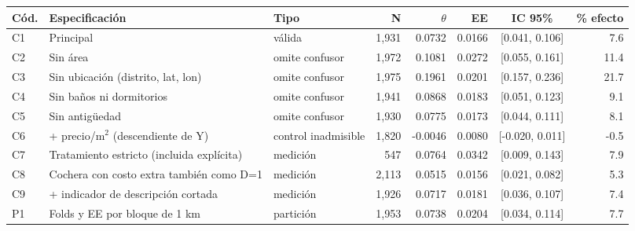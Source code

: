 \begin{tabular}{llp{3cm}rrrcr}
\toprule
Cód. & Especificación & Tipo & N & $\theta$ & EE & IC 95\% & \% efecto \\
\midrule
C1 & Principal & válida & 1,931 & 0.0732 & 0.0166 & [0.041, 0.106] & 7.6 \\
C2 & Sin área & omite confusor & 1,972 & 0.1081 & 0.0272 & [0.055, 0.161] & 11.4 \\
C3 & Sin ubicación (distrito, lat, lon) & omite confusor & 1,975 & 0.1961 & 0.0201 & [0.157, 0.236] & 21.7 \\
C4 & Sin baños ni dormitorios & omite confusor & 1,941 & 0.0868 & 0.0183 & [0.051, 0.123] & 9.1 \\
C5 & Sin antigüedad & omite confusor & 1,930 & 0.0775 & 0.0173 & [0.044, 0.111] & 8.1 \\
C6 & + precio/m$^2$ (descendiente de Y) & control inadmisible & 1,820 & -0.0046 & 0.0080 & [-0.020, 0.011] & -0.5 \\
C7 & Tratamiento estricto (incluida explícita) & medición & 547 & 0.0764 & 0.0342 & [0.009, 0.143] & 7.9 \\
C8 & Cochera con costo extra también como D=1 & medición & 2,113 & 0.0515 & 0.0156 & [0.021, 0.082] & 5.3 \\
C9 & + indicador de descripción cortada & medición & 1,926 & 0.0717 & 0.0181 & [0.036, 0.107] & 7.4 \\
P1 & Folds y EE por bloque de 1 km & partición & 1,953 & 0.0738 & 0.0204 & [0.034, 0.114] & 7.7 \\
\bottomrule
\end{tabular}